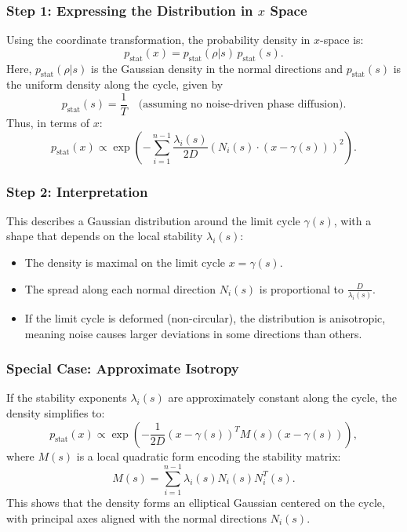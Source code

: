 \documentclass{article}
\theoremstyle{definition} \newtheorem{definition}{Definition}
\theoremstyle{remark} \newtheorem{remark}{Remark}
\newcounter{ct}
\begin{document}
\subsubsection{Step 1: Expressing the Distribution in $x$ Space}
Using the coordinate transformation, the probability density in $x$-space is:
\begin{equation}
    p_{\text{stat}}(x) = p_{\text{stat}}(\rho | s) \, p_{\text{stat}}(s).
\end{equation}
Here, $p_{\text{stat}}(\rho | s)$ is the Gaussian density in the normal directions and $p_{\text{stat}}(s)$ is the uniform density along the cycle, given by
\begin{equation}
    p_{\text{stat}}(s) = \frac{1}{T} \quad \text{(assuming no noise-driven phase diffusion)}.
\end{equation}
Thus, in terms of $x$:
\begin{equation}
    p_{\text{stat}}(x) \propto \exp \left( - \sum_{i=1}^{n-1} \frac{\lambda_i(s)}{2D} \left( N_i(s) \cdot (x - \gamma(s)) \right)^2 \right).
\end{equation}


\subsubsection{Step 2: Interpretation}
This describes a Gaussian distribution around the limit cycle $\gamma(s)$, with a shape that depends on the local stability $\lambda_i(s)$:
\begin{itemize}
    \item The density is maximal on the limit cycle $x = \gamma(s)$.
    \item The spread along each normal direction $N_i(s)$ is proportional to $\frac{D}{\lambda_i(s)}$.
    \item If the limit cycle is deformed (non-circular), the distribution is anisotropic, meaning noise causes larger deviations in some directions than others.
\end{itemize}


\subsubsection{Special Case: Approximate Isotropy}
If the stability exponents $\lambda_i(s)$ are approximately constant along the cycle, the density simplifies to:
\begin{equation}
    p_{\text{stat}}(x) \propto \exp \left( - \frac{1}{2D} (x - \gamma(s))^T M(s) (x - \gamma(s)) \right),
\end{equation}
where $M(s)$ is a local quadratic form encoding the stability matrix:
\begin{equation}
    M(s) = \sum_{i=1}^{n-1} \lambda_i(s) N_i(s) N_i^T(s).
\end{equation}
This shows that the density forms an elliptical Gaussian centered on the cycle, with principal axes aligned with the normal directions $N_i(s)$.
\end{document}

